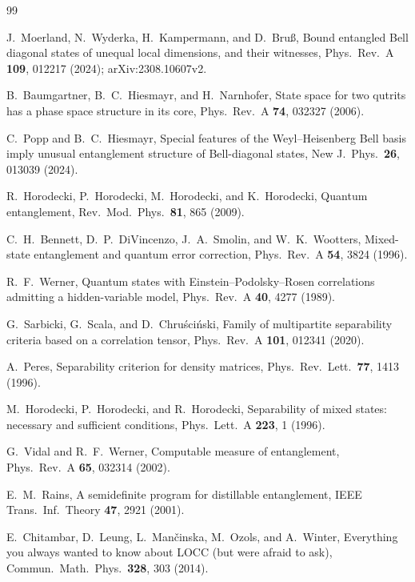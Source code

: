 \documentclass[11pt,a4paper]{article}
\theoremstyle{definition}
\theoremstyle{remark}
\begin{document}
\begin{thebibliography}{99}

 J.~Moerland, N.~Wyderka, H.~Kampermann, and D.~Bru\ss{},
Bound entangled Bell diagonal states of unequal local dimensions, and their witnesses,
Phys.\ Rev.\ A \textbf{109}, 012217 (2024); arXiv:2308.10607v2.

 B.~Baumgartner, B.~C.~Hiesmayr, and H.~Narnhofer,
State space for two qutrits has a phase space structure in its core,
Phys.\ Rev.\ A \textbf{74}, 032327 (2006).

 C.~Popp and B.~C.~Hiesmayr,
Special features of the Weyl--Heisenberg Bell basis imply unusual entanglement structure
of Bell-diagonal states, New J.\ Phys.\ \textbf{26}, 013039 (2024).

 R.~Horodecki, P.~Horodecki, M.~Horodecki, and K.~Horodecki,
Quantum entanglement, Rev.\ Mod.\ Phys.\ \textbf{81}, 865 (2009).

 C.~H.~Bennett, D.~P.~DiVincenzo, J.~A.~Smolin, and W.~K.~Wootters,
Mixed-state entanglement and quantum error correction,
Phys.\ Rev.\ A \textbf{54}, 3824 (1996).

 R.~F.~Werner,
Quantum states with Einstein--Podolsky--Rosen correlations admitting a
hidden-variable model, Phys.\ Rev.\ A \textbf{40}, 4277 (1989).

 G.~Sarbicki, G.~Scala, and D.~Chru\'sci\'nski,
Family of multipartite separability criteria based on a correlation tensor,
Phys.\ Rev.\ A \textbf{101}, 012341 (2020).

 A.~Peres, Separability criterion for density matrices,
Phys.\ Rev.\ Lett.\ \textbf{77}, 1413 (1996).

 M.~Horodecki, P.~Horodecki, and R.~Horodecki,
Separability of mixed states: necessary and sufficient conditions,
Phys.\ Lett.\ A \textbf{223}, 1 (1996).

 G.~Vidal and R.~F.~Werner, Computable measure of entanglement,
Phys.\ Rev.\ A \textbf{65}, 032314 (2002).

 E.~M.~Rains, A semidefinite program for distillable entanglement,
IEEE Trans.\ Inf.\ Theory \textbf{47}, 2921 (2001).

 E.~Chitambar, D.~Leung, L.~Man\v{c}inska, M.~Ozols, and A.~Winter,
Everything you always wanted to know about LOCC (but were afraid to ask),
Commun.\ Math.\ Phys.\ \textbf{328}, 303 (2014).


\end{thebibliography}
\end{document}
